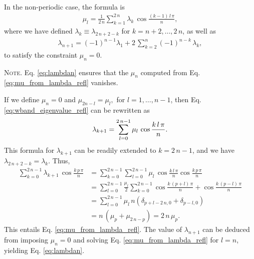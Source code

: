 \documentclass[reprint, floatfix]{revtex4-1}
\newcommand{\note}[1]{{\color{DarkGreen}\footnotesize \textsc{Note.} #1}}
\begin{document}
In the non-periodic case,
the formula is
%
\begin{align}
  \mu_l
  =
  \frac 1 { 2 \, n }
  \sum_{ k = 1 }^{ 2 \, n }
    \lambda_{ k } \,
    \cos \frac{ (k - 1) \, l \, \pi }
              {            n        }
  ,
\label{eq:mu_from_lambda_refl}
\end{align}
%
where
we have defined
$\lambda_k \equiv \lambda_{2 \, n + 2 - k}$
for $k = n + 2, \dots, 2 \, n$,
as well as
%
\begin{align}
  \lambda_{ n + 1 }
  =
  (-1)^{ n - 1 }
  \lambda_1
  +
  2 \, \sum_{ k = 2 }^{ n }
      (-1)^{n - k} \, \lambda_k
  ,
\label{eq:lambdan}
\end{align}
to satisfy the constraint $\mu_n = 0$.
%
\note{Eq. \eqref{eq:lambdan}
  ensures that the $\mu_n$
  computed from Eq. \eqref{eq:mu_from_lambda_refl}
  vanishes.

  If we define $\mu_n = 0$ and
  $
    \mu_{ 2 n - l } = \mu_l,
  $
  for
  $l = 1, \dots, n - 1$,
  then Eq. \eqref{eq:wband_eigenvalue_refl} can be rewritten as
  \begin{align}
    \lambda_{k+1}
    =
    \sum_{ l = 0 }^{ 2 \, n - 1 }
    \mu_l \, \cos \frac{ k \, l \, \pi } { n }.
  \notag
  \end{align}
  This formula for $\lambda_{k+1}$
  can be readily extended to $k = 2 \, n - 1$,
  and we have
  $
    \lambda_{ 2 \, n + 2 - k } = \lambda_k
    .
  $
  Thus,
  $$
  \begin{aligned}
    \sum_{ k = 0 }^{ 2 \, n - 1 }
      \lambda_{ k + 1 } \,
      \cos \frac{ k \, p \, \pi }
                {      n        }
    &=
    \sum_{ k = 0 }^{ 2 \, n - 1 }
      \sum_{ l = 0 }^{ 2 \, n - 1 }
        \mu_l \,
        \cos \frac{ k \, l \, \pi }
                  {      n        }
        \cos \frac{ k \, p \, \pi }
                  {      n        }
    \\
    &=
    \sum_{ l = 0 }^{ 2 \, n - 1 }
      \frac{ \mu_l } { 2 }
      \sum_{ k = 0 }^{ 2 \, n - 1 }
        \cos \frac{ k \, (p + l) \, \pi }
                  {      n        }
                  +
        \cos \frac{ k \, (p - l) \, \pi }
                  {      n        }
    \\
    &=
    \sum_{ l = 0 }^{ 2 \, n - 1 }
      \mu_l \, n \left(
        \delta_{ p + l - 2 \, n, 0 }
        +
        \delta_{ p - l, 0 }
      \right)
    \\
    &=
    n \, \left( \mu_p + \mu_{ 2 \, n - p} \right)
    =
    2 \, n \, \mu_p.
  \end{aligned}
  $$
  This entails Eq. \eqref{eq:mu_from_lambda_refl}.
  The value of $\lambda_{n + 1}$
  can be deduced from
  imposing $\mu_n = 0$
  and solving Eq. \eqref{eq:mu_from_lambda_refl}
  for $l = n$,
  yielding Eq. \eqref{eq:lambdan}.
}
\end{document}
